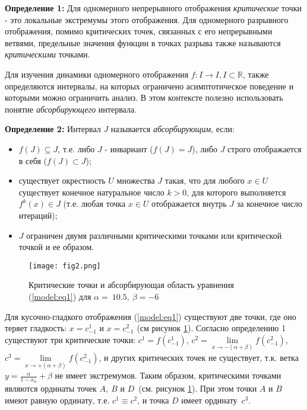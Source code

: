 \documentclass[a4paper, 14pt]{extreport}
\numberwithin{equation}{section}
\numberwithin{figure}{section}
\numberwithin{table}{section}
\begin{document}
		{\bf Определение 1:} Для одномерного непрерывного отображения {\it критические} точки - это локальные экстремумы этого отображения. Для одномерного разрывного отображения, помимо критических точек, связанных с его непрерывными ветвями, предельные значения функции в точках разрыва также называются {\it критическими} точками. %

		Для изучения динамики одномерного отображения $ f: I \to I, I \subset 	\mathbb{R} $, также определяются интервалы, на которых ограничено асимптотическое поведение и которыми можно ограничить анализ. В этом контексте полезно использовать понятие {\it абсорбирующего} интервала. %

		{\bf Определение 2:} Интервал $ J $ называется {\it абсорбирующим}, если:
		\begin{itemize}
			\item $ f(J) \subseteq J $, т.е. либо $J$ - инвариант ($f(J) = J$), либо $J$ строго отображается в себя ($f(J) \subset J$);
			\item существует окрестность $U$ множества $J$ такая, что для любого $ x \in U $ существует конечное натуральное число $k > 0$, для которого выполняется $ f^k(x) \in J $ (т.е. любая точка $x \in U$ отображается внутрь $J$ за конечное число итераций);
			\item $J$ ограничен двумя различными критическими точками или критической точкой и ее образом.
		\end{itemize} %

		\begin{figure}[h!]
			\begin{center}
				\texttt{[image: fig2.png]}
			\end{center}
			\caption{Критические точки и абсорбирующая область уравнения (\ref{model:eq1}) для $ \alpha =~10.5,~\beta = -6 $}
			\label{fig2}		
		\end{figure}
		Для кусочно-гладкого отображения (\ref{model:eq1}) существуют две точки, где оно теряет гладкость: $ x = c^{1}_{-1} $ и $ x = c^{2}_{-1} $ (см рисунок \ref{fig2}). Согласно определению 1 существуют три критические точки: $ c^{1} = f(c^{1}_{-1}) $, $ c^{2} = \lim\limits_{x \to -(\alpha + \beta)} f(c^{2}_{-1}) $, $ c^{3} = \lim\limits_{x \to +(\alpha + \beta)} f(c^{2}_{-1}) $, и других критических точек не существует, т.к. ветка $ y = \frac{\alpha}{1 - x_{n}} + \beta $ не имеет экстремумов. Таким образом, критическими точками являются ординаты точек $ A,~B $ и $ D $~(см. рисунок \ref{fig2}). При этом точки $ A $ и $ B $ имеют равную ординату, т.е. $ c^{1} \equiv c^{2} $, и точка $ D $ имеет ординату~$ c^{3} $. %
\end{document}
